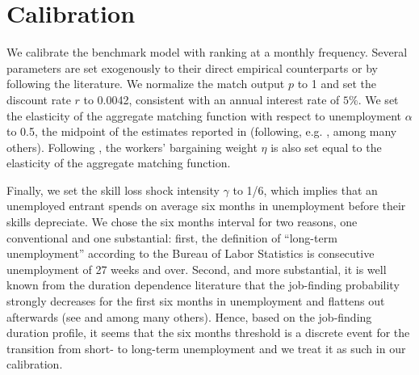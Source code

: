\documentclass[12pt]{article} %
\theoremstyle{definition}
\begin{document}
\fi




\section{Calibration}\label{section calibration} 
We calibrate the benchmark model with ranking at a monthly frequency.
Several parameters are set exogenously to their direct empirical counterparts or by following the literature.
We normalize the match output $p$ to 1 and set the discount rate $r$ to 0.0042, consistent with an annual interest rate of $5\%$.
We set the elasticity of the aggregate matching function with respect to unemployment $\alpha$ to 0.5, the midpoint of the estimates reported in \cite{petrongolo2001looking} (following, e.g. \citealt{menzio2016directed}, among many others).
Following \cite{shimer2005cyclical}, the workers' bargaining weight $\eta$ is also set equal to the elasticity of the aggregate matching function.

Finally, we set the skill loss shock intensity $\gamma$ to 1/6, which implies that an unemployed entrant spends on average six months in unemployment before their skills depreciate.
We chose the six months interval for two reasons, one conventional and one substantial: first, the definition of ``long-term unemployment'' according to the Bureau of Labor Statistics is consecutive unemployment of 27 weeks and over.
Second, and more substantial, it is well known from the duration dependence literature that the job-finding probability strongly decreases for the first six months in unemployment and flattens out afterwards (see \citealt{jarosch2019statistical} and \citealt{kospentaris2021unobserved} among many others).
Hence, based on the job-finding duration profile, it seems that the six months threshold is a discrete event for the transition from short- to long-term unemployment and we treat it as such in our calibration.
\end{document}

